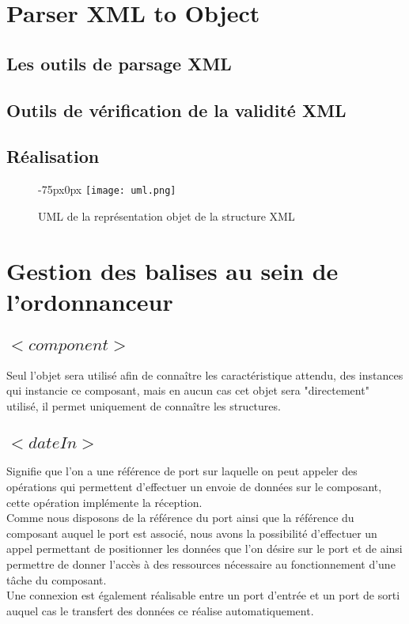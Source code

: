 \documentclass{article}
\begin{document}
\section{Parser XML to Object}
\subsection{Les outils de parsage XML}
\subsection{Outils de vérification de la validité XML}
\subsection{Réalisation}


\begin{figure}[]
\centering
\begin{changemargin}{-75px}{0px}
\texttt{[image: uml.png]}
\end{changemargin}
\caption{UML de la représentation objet de la structure XML}
\label{figure1}
\end{figure}

\pagebreak

\section{Gestion des balises au sein de l'ordonnanceur}

\subsection{$<component>$}
    Seul l'objet sera utilisé afin de connaître les caractéristique attendu, des instances qui instancie ce composant, mais en aucun cas cet objet sera "directement" utilisé, il permet uniquement de connaître les structures.

\subsection{$<dateIn>$}

    Signifie que l'on a une référence de port sur laquelle on peut appeler des opérations qui permettent d'effectuer un envoie de données sur le composant, cette opération implémente la réception.\\
    Comme nous disposons de la référence du port ainsi que la référence du composant auquel le port est associé, nous avons la possibilité d'effectuer un appel permettant de positionner les données que l'on désire sur le port et de ainsi permettre de donner l'accès à des ressources nécessaire au fonctionnement d'une tâche du composant.\\
    Une connexion est également réalisable entre un port d'entrée et un port de sorti auquel cas le transfert des données ce réalise automatiquement.
\end{document}
